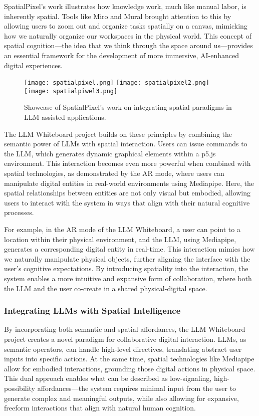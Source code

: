 SpatialPixel's work illustrates how knowledge work, much like manual labor, is inherently spatial.
Tools like Miro and Mural brought attention to this by allowing users to zoom out and organize tasks spatially on a canvas, mimicking how we naturally organize our workspaces in the physical world.
This concept of spatial cognition—the idea that we think through the space around us—provides an essential framework for the development of more immersive, AI-enhanced digital experiences.

\begin{figure}[h]
    \centering
    \texttt{[image: spatialpixel.png]}
    \texttt{[image: spatialpixel2.png]}
    \texttt{[image: spatialpiwel3.png]}
    \caption{Showcase of SpatialPixel's work on integrating spatial paradigms in LLM assisted applications.}
    \vspace{0.1cm}
    \label{fig:spatialpixel}
\end{figure}

The LLM Whiteboard project builds on these principles by combining the semantic power of LLMs with spatial interaction.
Users can issue commands to the LLM, which generates dynamic graphical elements within a p5.js environment.
This interaction becomes even more powerful when combined with spatial technologies, as demonstrated by the AR mode, where users can manipulate digital entities in real-world environments using Mediapipe.
Here, the spatial relationships between entities are not only visual but embodied, allowing users to interact with the system in ways that align with their natural cognitive processes.

For example, in the AR mode of the LLM Whiteboard, a user can point to a location within their physical environment, and the LLM, using Mediapipe, generates a corresponding digital entity in real-time. This interaction mimics how we naturally manipulate physical objects, further aligning the interface with the user’s cognitive expectations. By introducing spatiality into the interaction, the system enables a more intuitive and expansive form of collaboration, where both the LLM and the user co-create in a shared physical-digital space.


\subsubsection{Integrating LLMs with Spatial Intelligence}
By incorporating both semantic and spatial affordances, the LLM Whiteboard project creates a novel paradigm for collaborative digital interaction.
LLMs, as semantic operators, can handle high-level directives, translating abstract user inputs into specific actions.
At the same time, spatial technologies like Mediapipe allow for embodied interactions, grounding those digital actions in physical space.
This dual approach enables what can be described as low-signaling, high-possibility affordances—the system requires minimal input from the user to generate complex and meaningful outputs, while also allowing for expansive, freeform interactions that align with natural human cognition.

